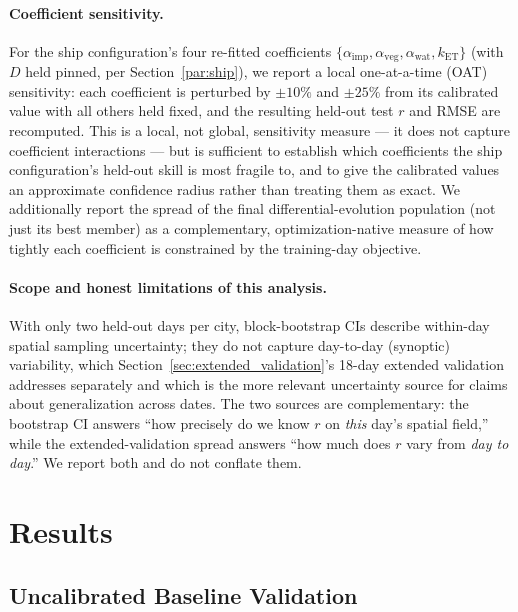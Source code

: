 \documentclass[12pt, letterpaper]{article}
\begin{document}
\paragraph{Coefficient sensitivity.}
For the ship configuration's four re-fitted coefficients
$\{\alpha_{\mathrm{imp}}, \alpha_{\mathrm{veg}}, \alpha_{\mathrm{wat}},
k_{\mathrm{ET}}\}$ (with $D$ held pinned, per Section~\ref{par:ship}), we
report a local one-at-a-time (OAT) sensitivity: each coefficient is
perturbed by $\pm 10\%$ and $\pm 25\%$ from its calibrated value with all
others held fixed, and the resulting held-out test $r$ and RMSE are
recomputed. This is a local, not global, sensitivity measure — it does not
capture coefficient interactions — but is sufficient to establish which
coefficients the ship configuration's held-out skill is most fragile to,
and to give the calibrated values an approximate confidence radius rather
than treating them as exact. We additionally report the spread of the
final differential-evolution population (not just its best member) as a
complementary, optimization-native measure of how tightly each coefficient
is constrained by the training-day objective.

\paragraph{Scope and honest limitations of this analysis.}
With only two held-out days per city, block-bootstrap CIs describe
within-day spatial sampling uncertainty; they do not capture
day-to-day (synoptic) variability, which Section~\ref{sec:extended_validation}'s
18-day extended validation addresses separately and which is the more
relevant uncertainty source for claims about generalization across dates.
The two sources are complementary: the bootstrap CI answers ``how
precisely do we know $r$ on \emph{this} day's spatial field,'' while the
extended-validation spread answers ``how much does $r$ vary from
\emph{day to day}.'' We report both and do not conflate them.

\section{Results}
\label{sec:results}

\subsection{Uncalibrated Baseline Validation}
\end{document}
